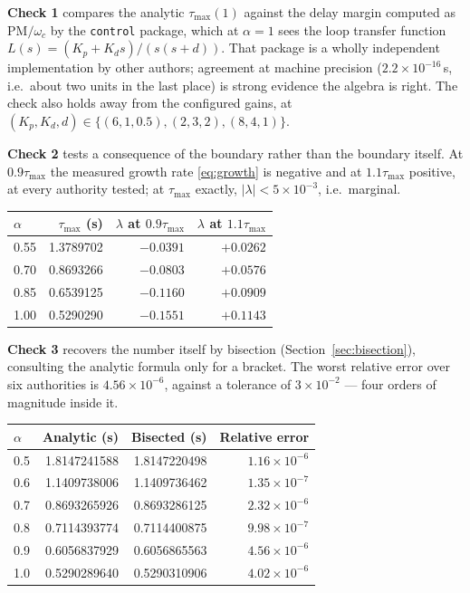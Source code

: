 \documentclass[11pt,a4paper]{article}
\theoremstyle{plain}
\theoremstyle{definition}
\begin{document}
\textbf{Check 1} compares the analytic $\tau_{\max}(1)$ against the delay
margin computed as $\mathrm{PM}/\omega_c$ by the \texttt{control}
package, which at $\alpha = 1$ sees the loop transfer function
$L(s) = (K_p + K_d s)/(s(s+d))$. That package is a wholly independent
implementation by other authors; agreement at machine precision
($2.2\times10^{-16}$\,s, i.e.\ about two units in the last place) is strong
evidence the algebra is right. The check also holds away from the
configured gains, at $(K_p, K_d, d) \in \{(6,1,0.5), (2,3,2),
(8,4,1)\}$.

\textbf{Check 2} tests a consequence of the boundary rather than the
boundary itself. At $0.9\tau_{\max}$ the measured growth rate
\eqref{eq:growth} is negative and at $1.1\tau_{\max}$ positive, at every
authority tested; at $\tau_{\max}$ exactly, $|\lambda| < 5\times10^{-3}$,
i.e.\ marginal.

\begin{center}
\small
\begin{tabular}{@{}lrrr@{}}
\toprule
$\alpha$ & $\tau_{\max}$ (s) & $\lambda$ at $0.9\tau_{\max}$ & $\lambda$ at $1.1\tau_{\max}$ \\
\midrule
0.55 & 1.3789702 & $-0.0391$ & $+0.0262$ \\
0.70 & 0.8693266 & $-0.0803$ & $+0.0576$ \\
0.85 & 0.6539125 & $-0.1160$ & $+0.0909$ \\
1.00 & 0.5290290 & $-0.1551$ & $+0.1143$ \\
\bottomrule
\end{tabular}
\end{center}

\textbf{Check 3} recovers the number itself by bisection
(Section~\ref{sec:bisection}), consulting the analytic formula only for
a bracket. The worst relative error over six authorities is
$4.56\times10^{-6}$, against a tolerance of $3\times10^{-2}$ --- four
orders of magnitude inside it.

\begin{center}
\small
\begin{tabular}{@{}lrrr@{}}
\toprule
$\alpha$ & Analytic (s) & Bisected (s) & Relative error \\
\midrule
0.5 & 1.8147241588 & 1.8147220498 & $1.16\times10^{-6}$ \\
0.6 & 1.1409738006 & 1.1409736462 & $1.35\times10^{-7}$ \\
0.7 & 0.8693265926 & 0.8693286125 & $2.32\times10^{-6}$ \\
0.8 & 0.7114393774 & 0.7114400875 & $9.98\times10^{-7}$ \\
0.9 & 0.6056837929 & 0.6056865563 & $4.56\times10^{-6}$ \\
1.0 & 0.5290289640 & 0.5290310906 & $4.02\times10^{-6}$ \\
\bottomrule
\end{tabular}
\end{center}
\end{document}
